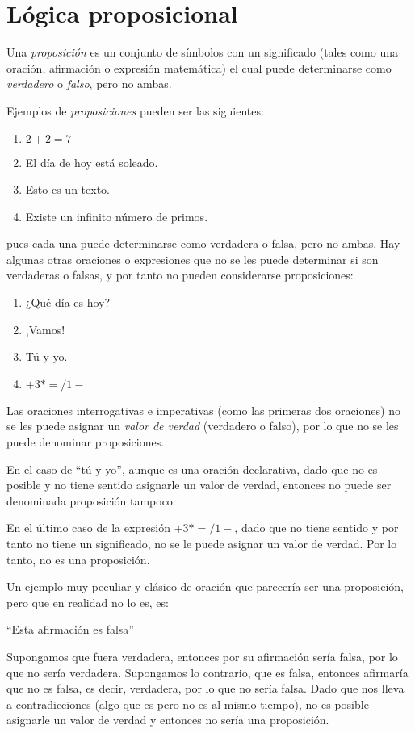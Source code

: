 \section{Lógica proposicional}
\begin{definition}[Proposición]
	Una \emph{proposición} es un conjunto de símbolos con un significado (tales como una oración, afirmación o expresión matemática) el cual puede determinarse como \emph{verdadero} o \emph{falso}, pero no ambas.
\end{definition}
Ejemplos de \emph{proposiciones} pueden ser las siguientes:
\begin{enumerate}
	\item $2 + 2 = 7$
	\item El día de hoy está soleado.
	\item Esto es un texto.
	\item Existe un infinito número de primos.
\end{enumerate}
pues cada una puede determinarse como verdadera o falsa, pero no ambas.
Hay algunas otras oraciones o expresiones que no se les puede determinar si son verdaderas o falsas, y por tanto no pueden considerarse proposiciones:
\begin{enumerate}
	\item ¿Qué día es hoy?
	\item ¡Vamos!
	\item Tú y yo.
	\item $+3* = /1-$
\end{enumerate}
Las oraciones interrogativas e imperativas (como las primeras dos oraciones) no se les puede asignar un \emph{valor de verdad} (verdadero o falso), por lo que no se les puede denominar proposiciones.\par 
En el caso de ``tú y yo'', aunque es una oración declarativa, dado que no es posible y no tiene sentido asignarle un valor de verdad, entonces no puede ser denominada proposición tampoco.\par
En el último caso de la expresión $+3* = /1-$, dado que no tiene sentido y por tanto no tiene un significado, no se le puede asignar un valor de verdad. Por lo tanto, no es una proposición.\par 
Un ejemplo muy peculiar y clásico de oración que parecería ser una proposición, pero que en realidad no lo es, es:
\begin{center}
	``Esta afirmación es falsa''
\end{center}
Supongamos que fuera verdadera, entonces por su afirmación sería falsa, por lo que no sería verdadera. Supongamos lo contrario, que es falsa, entonces afirmaría que no es falsa, es decir, verdadera, por lo que no sería falsa. Dado que nos lleva a contradicciones (algo que es pero no es al mismo tiempo), no es posible asignarle un valor de verdad y entonces no sería una proposición.\par 
